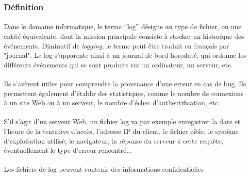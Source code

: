 \subsubsection{Définition}

\paragraph{} Dans le domaine informatique, le terme ``log'' désigne un type de
fichier, ou une entité équivalente, dont la mission principale consiste à
stocker un historique des événements. Diminutif de \textit{logging}, le terme
peut être traduit en français par "journal". Le log s'apparente ainsi à un
journal de bord horodaté, qui ordonne les différents événements qui se sont
produits sur un ordinateur, un serveur, etc.

\paragraph{} Ils s'avèrent utiles pour comprendre la provenance d'une erreur en
cas de bug. Ils permettent également d'établir des statistiques, comme le
nombre de connexions à un site Web ou à un serveur, le nombre d'échec
d'authentification, etc.

\paragraph{} S'il s'agit d'un serveur Web, un fichier log va par exemple
enregistrer la date et l'heure de la tentative d'accès, l'adresse IP du client,
le fichier cible, le système d'exploitation utilisé, le navigateur, la réponse
du serveur à cette requête, éventuellement le type d'erreur rencontré...

\paragraph{} Les fichiers de log peuvent contenir des informations
confidentielles
